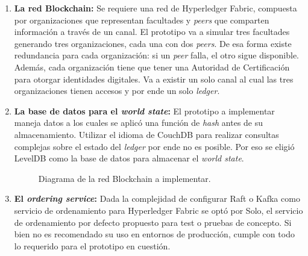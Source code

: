 \begin{enumerate}
    \item \textbf{La red Blockchain: } Se requiere una red de Hyperledger Fabric, compuesta por organizaciones que representan facultades y \textit{peers} que comparten información a través de un canal. El prototipo va a simular tres facultades generando tres organizaciones, cada una con dos \textit{peers}. De esa forma existe redundancia para cada organización: si un \textit{peer} falla, el otro sigue disponible. Además, cada organización tiene que tener una Autoridad de Certificación para otorgar identidades digitales. Va a existir un solo canal al cual las tres organizaciones tienen accesos y por ende un solo \textit{ledger}.
    \item \textbf{La base de datos para el \textit{world state}: } El prototipo a implementar maneja datos a los cuales se aplicó una función de \textit{hash} antes de su almacenamiento. Utilizar el idioma de CouchDB para realizar consultas complejas sobre el estado del \textit{ledger} por ende no es posible. Por eso se eligió LevelDB como la base de datos para almacenar el \textit{world state}.
    \begin{figure}%
        \caption{Diagrama de la red Blockchain a implementar.}
        \label{fig:bc-network}
    \end{figure}
    \item \textbf{El \textit{ordering service}: }Dada la complejidad de configurar Raft o Kafka como servicio de ordenamiento para Hyperledger Fabric se optó por Solo, el servicio de ordenamiento por defecto propuesto para test o pruebas de concepto. Si bien no es recomendado su uso en entornos de producción, cumple con todo lo requerido para el prototipo en cuestión.


\end{enumerate}

